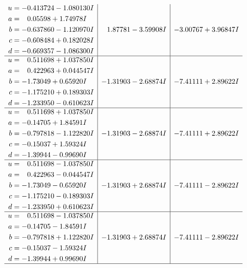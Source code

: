 \documentclass[1p]{elsarticle_modified}
\theoremstyle{definition}
\begin{document}
$$\begin{array}{c|c|c}
\begin{aligned}
u &= -0.413724 - 1.080130 I \\
a &= \phantom{-}0.05598 + 1.74978 I \\
b &= -0.637860 - 1.120970 I \\
c &= -0.608484 + 0.182028 I \\
d &= -0.669357 - 1.086300 I\end{aligned}
 & \phantom{-}1.87781 - 3.59908 I & -3.00767 + 3.96847 I \\ \hline\begin{aligned}
u &= \phantom{-}0.511698 + 1.037850 I \\
a &= \phantom{-}0.422963 + 0.044547 I \\
b &= -1.73049 + 0.65920 I \\
c &= -1.175210 + 0.189303 I \\
d &= -1.233950 - 0.610623 I\end{aligned}
 & -1.31903 - 2.68874 I & -7.41111 + 2.89622 I \\ \hline\begin{aligned}
u &= \phantom{-}0.511698 + 1.037850 I \\
a &= -0.14705 + 1.84591 I \\
b &= -0.797818 - 1.122820 I \\
c &= -0.15037 + 1.59324 I \\
d &= -1.39944 - 0.99690 I\end{aligned}
 & -1.31903 - 2.68874 I & -7.41111 + 2.89622 I \\ \hline\begin{aligned}
u &= \phantom{-}0.511698 - 1.037850 I \\
a &= \phantom{-}0.422963 - 0.044547 I \\
b &= -1.73049 - 0.65920 I \\
c &= -1.175210 - 0.189303 I \\
d &= -1.233950 + 0.610623 I\end{aligned}
 & -1.31903 + 2.68874 I & -7.41111 - 2.89622 I \\ \hline\begin{aligned}
u &= \phantom{-}0.511698 - 1.037850 I \\
a &= -0.14705 - 1.84591 I \\
b &= -0.797818 + 1.122820 I \\
c &= -0.15037 - 1.59324 I \\
d &= -1.39944 + 0.99690 I\end{aligned}
 & -1.31903 + 2.68874 I & -7.41111 - 2.89622 I\\
 \hline 
 \end{array}$$\newpage$$\begin{array}{c|c|c}  

\end{array}$$
\end{document}
